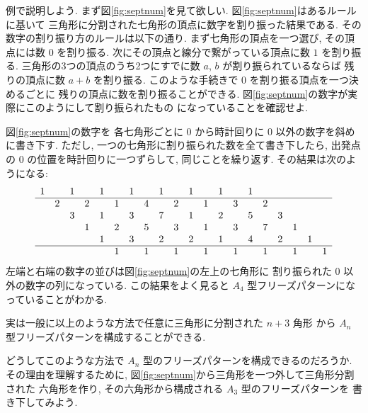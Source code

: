 \documentclass[12pt,twoside,dvipdfm]{jarticle}
\theoremstyle{definition} %
\theoremstyle{definition} %
\theoremstyle{definition} %
\numberwithin{theorem}{section}
\numberwithin{equation}{section}
\numberwithin{figure}{section}
\numberwithin{table}{section}
\newcommand\figureref[1]{図\ref{#1}}
\newcommand\figref[1]{\figureref{#1}}
\begin{document}
例で説明しよう. 
まず\figref{fig:septnum}を見て欲しい.
\figref{fig:septnum}はあるルールに基いて
三角形に分割された七角形の頂点に数字を割り振った結果である.
その数字の割り振り方のルールは以下の通り.
まず七角形の頂点を一つ選び, その頂点には数 $0$ を割り振る.
次にその頂点と線分で繋がっている頂点に数 $1$ を割り振る.
三角形の3つの頂点のうち2つにすでに数 $a$, $b$ が割り振られているならば
残りの頂点に数 $a+b$ を割り振る.
このような手続きで $0$ を割り振る頂点を一つ決めるごとに
残りの頂点に数を割り振ることができる.
\figref{fig:septnum}の数字が実際にこのようにして割り振られたもの
になっていることを確認せよ.

\figref{fig:septnum}の数字を
各七角形ごとに $0$ から時計回りに $0$ 以外の数字を斜めに書き下す.
ただし, 一つの七角形に割り振られた数を全て書き下したら, 
出発点の $0$ の位置を時計回りに一つずらして, 同じことを繰り返す.
その結果は次のようになる:
\begin{equation}
\begin{array}{cccccccccccccccccccc}
 1 &   & 1 &   & 1 &   & 1 &   & 1 &   & 1 &   & 1 &   & 1 &   &   &   &   &   \\ \hline
   & 2 &   & 2 &   & 1 &   & 4 &   & 2 &   & 1 &   & 3 &   & 2 &   &   &   &   \\
   &   & 3 &   & 1 &   & 3 &   & 7 &   & 1 &   & 2 &   & 5 &   & 3 &   &   &   \\
   &   &   & 1 &   & 2 &   & 5 &   & 3 &   & 1 &   & 3 &   & 7 &   & 1 &   &   \\
   &   &   &   & 1 &   & 3 &   & 2 &   & 2 &   & 1 &   & 4 &   & 2 &   & 1 &   \\ \hline
   &   &   &   &   & 1 &   & 1 &   & 1 &   & 1 &   & 1 &   & 1 &   & 1 &   & 1 \\
\end{array}
\label{eq:septnum}
\end{equation}
左端と右端の数字の並びは\figref{fig:septnum}の左上の七角形に
割り振られた $0$ 以外の数字の列になっている.
この結果をよく見ると $A_4$ 型フリーズパターンになっていることがわかる.

実は一般に以上のような方法で任意に三角形に分割された $n+3$ 角形
から $A_n$ 型フリーズパターンを構成することができる.

どうしてこのような方法で $A_n$ 型のフリーズパターンを構成できるのだろうか.
その理由を理解するために, 
\figref{fig:septnum}から三角形を一つ外して三角形分割された
六角形を作り, その六角形から構成される $A_3$ 型のフリーズパターンを
書き下してみよう. 
\end{document}
